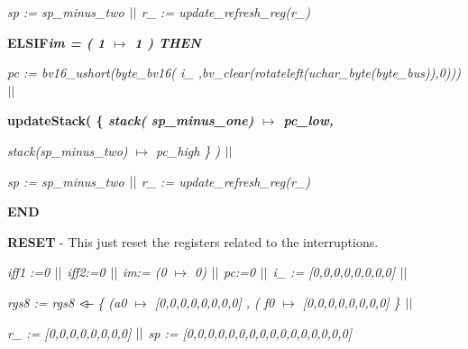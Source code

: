 \documentclass[11pt]{article} %
\begin{document}
\begin{sloppypar}
\hspace*{0.10in}\it sp \rm := \it sp\_minus\_two  $\mbox{$\mid\mid$}$ \hspace*{0.10in}\it
r\_ \rm := \it update\_refresh\_reg\rm (\it r\_\rm )\hspace*{0.85in}

\hspace*{0.00in}\bf ELSIF\hspace*{0.10in}\it im \rm = \rm ( \rm 1  $\mapsto$ 
\rm 1 \rm ) \bf THEN  \hspace*{0.70in}

\hspace*{0.10in}\it pc \rm := \it bv16\_ushort\rm (\it byte\_bv16\rm ( \it i\_
\rm ,\it bv\_clear\rm (\it rotateleft\rm (\it uchar\_byte\rm (\it byte\_bus\rm )\rm )\rm ,\rm 0\rm )\rm )\rm )$\mbox{$\mid\mid$}$

\hspace*{0.10in}\bf updateStack\rm ( \rm \{ \it stack\rm ( \it
sp\_minus\_one\rm )  $\mapsto$  \it pc\_low\rm ,

\hspace*{0.10in}\it stack\rm (\it sp\_minus\_two\rm )  $\mapsto$  \it pc\_high
\rm \} \rm )  $\mbox{$\mid\mid$}$

\hspace*{0.10in}\it sp \rm := \it sp\_minus\_two  $\mbox{$\mid\mid$}$ \hspace*{0.10in}\it
r\_ \rm := \it update\_refresh\_reg\rm (\it r\_\rm )

\hspace*{0.00in}\bf END\hspace*{0.10in}\\
\end{sloppypar}


\textbf{RESET}  - This just reset the registers related to the interruptions.

\begin{sloppypar}
\it iff1 \rm :=\rm 0 $\mbox{$\mid\mid$}$ \it iff2\rm :=\rm 0 $\mbox{$\mid\mid$}$  \it  im\rm := \rm (\rm 0 $\mapsto$ \rm 0\rm )  $\mbox{$\mid\mid$}$ 
\it pc\rm :=\rm 0 $\mbox{$\mid\mid$}$ \it i\_ \rm := [0,0,0,0,0,0,0,0] $\mbox{$\mid\mid$}$

\it rgs8 \rm := \it rgs8  $\lover$  \rm \{ \rm (\it a0  $\mapsto$ \rm [0,0,0,0,0,0,0,0] , \rm (\it
f0 $\mapsto$ \rm [0,0,0,0,0,0,0,0] \rm \} $\mbox{$\mid\mid$}$

\it r\_  \rm := [0,0,0,0,0,0,0,0] $\mbox{$\mid\mid$}$ \it sp \rm := [0,0,0,0,0,0,0,0,0,0,0,0,0,0,0,0]
\end{sloppypar}


\end{document}
